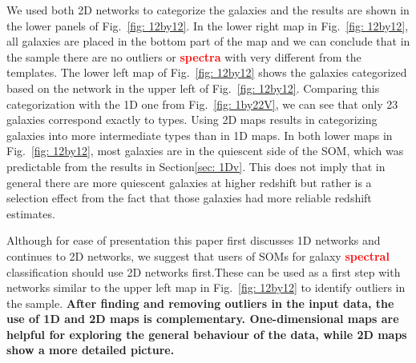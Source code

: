     We used both 2D networks to categorize the  galaxies and the results are shown in the lower panels of Fig.~\ref{fig: 12by12}.
    In the lower right map in Fig.~\ref{fig: 12by12}, all galaxies are placed in the bottom part of the map and we can conclude that in the  sample there are no outliers or \textbf{\textcolor{red}{spectra}} with very different from the  templates.
    The lower left map of Fig.~\ref{fig: 12by12} shows the  galaxies categorized based on the network in the upper left of Fig.~\ref{fig: 12by12}. 
    Comparing this categorization with the 1D one from Fig.~\ref{fig: 1by22V}, we can see that only 23 galaxies correspond exactly to  types.
    Using 2D maps results in categorizing galaxies into more intermediate types than in 1D maps.
    In both lower maps in Fig.~\ref{fig: 12by12}, most galaxies are in the quiescent side of the SOM, which was predictable from the results in Section\ref{sec: 1Dv}. This does not imply that in general there are more quiescent galaxies at higher redshift but rather is a selection effect from the fact that those galaxies had more reliable redshift estimates.
    
    Although for ease of presentation this paper first discusses 1D networks and continues to 2D networks, we suggest that users of SOMs for galaxy \textbf{\textcolor{red}{spectral}} classification should use 2D networks first.These can be used as a first step with networks similar to the upper left map in Fig.~\ref{fig: 12by12} to identify outliers in the sample.
    \textbf{After finding and removing outliers in the input data, the use of 1D and 2D maps is complementary.
    One-dimensional maps are helpful for exploring the general behaviour of the data, while 2D maps show a more detailed picture.}
